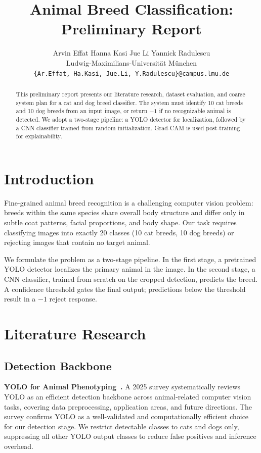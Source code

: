 \documentclass[10pt,twocolumn,letterpaper]{article}
\title{
  \vspace{-0.5cm}
  \textbf{Animal Breed Classification: Preliminary Report}
}
\author{
  Arvin Effat \quad Hanna Kasi \quad Jue Li \quad Yannick Radulescu \\[2pt]
  Ludwig-Maximilians-Universität München \\[2pt]
  \texttt{\{Ar.Effat, Ha.Kasi, Jue.Li, Y.Radulescu\}@campus.lmu.de}
}
\date{}
\begin{document}
\maketitle
\thispagestyle{fancy}

\begin{abstract}
This preliminary report presents our literature research, dataset evaluation, and coarse system plan for a cat and dog breed classifier. The system must identify 10 cat breeds and 10 dog breeds from an input image, or return $-1$ if no recognizable animal is detected. We adopt a two-stage pipeline: a YOLO detector for localization, followed by a CNN classifier trained from random initialization. Grad-CAM is used post-training for explainability.
\end{abstract}

\section{Introduction}

Fine-grained animal breed recognition is a challenging computer vision problem: breeds within the same species share overall body structure and differ only in subtle coat patterns, facial proportions, and body shape. Our task requires classifying images into exactly 20 classes (10 cat breeds, 10 dog breeds) or rejecting images that contain no target animal.

We formulate the problem as a two-stage pipeline. In the first stage, a pretrained YOLO detector localizes the primary animal in the image. In the second stage, a CNN classifier, trained from scratch on the cropped detection, predicts the breed. A confidence threshold gates the final output; predictions below the threshold result in a $-1$ reject response.

\section{Literature Research}

\subsection{Detection Backbone}

\textbf{YOLO for Animal Phenotyping~\cite{yolo_animal_2025}.}
A 2025 survey systematically reviews YOLO as an efficient detection backbone across animal-related computer vision tasks, covering data preprocessing, application areas, and future directions. The survey confirms YOLO as a well-validated and computationally efficient choice for our detection stage. We restrict detectable classes to cats and dogs only, suppressing all other YOLO output classes to reduce false positives and inference overhead.
\end{document}

